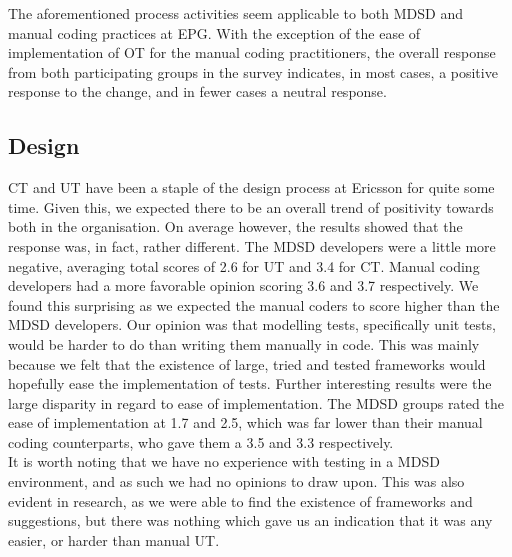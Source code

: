 \documentclass[final_report_innit.tex]{subfiles}
\begin{document}
The aforementioned process activities seem applicable to both MDSD and manual coding practices at EPG. With the exception of the ease of implementation of OT for the manual coding practitioners, the overall response from both participating groups in the survey indicates, in most cases, a positive response to the change, and in fewer cases a neutral response.

\subsection{Design}

CT and UT have been a staple of the design process at Ericsson for quite some time. Given this, we expected there to be an overall trend of positivity towards both in the organisation. On average however, the results showed that the response was, in fact, rather different. The MDSD developers were a little more negative, averaging total scores of 2.6 for UT and 3.4 for CT. Manual coding developers had a more favorable opinion scoring 3.6 and 3.7 respectively. We found this surprising as we expected the manual coders to score higher than the MDSD developers. Our opinion was that modelling tests, specifically unit tests, would be harder to do than writing them manually in code. This was mainly because we felt that the existence of large, tried and tested frameworks would hopefully ease the implementation of tests. Further interesting results were the large disparity in regard to ease of implementation. The MDSD groups rated the ease of implementation at 1.7 and 2.5, which was far lower than their manual coding counterparts, who gave them a 3.5 and 3.3 respectively.
\\

It is worth noting that we have no experience with testing in a MDSD environment, and as such we had no opinions to draw upon. This was also evident in research, as we were able to find the existence of frameworks and suggestions, but there was nothing which gave us an indication that it was any easier, or harder than manual UT.
\\
\end{document}
